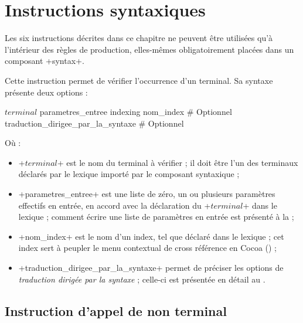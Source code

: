 
\chapter{Instructions syntaxiques}

Les six instructions décrites dans ce chapitre ne peuvent être utilisées qu'à l'intérieur des règles de production, elles-mêmes obligatoirement placées dans un composant \ggs+syntax+.




Cette instruction permet de vérifier l'occurrence d'un terminal. Sa syntaxe présente deux options :
\begin{galgascode}
$terminal$ parametres_entree
indexing nom_index # Optionnel
traduction_dirigee_par_la_syntaxe # Optionnel
\end{galgascode}

Où :
\begin{itemize}
  \item \ggs+$terminal$+ est le nom du terminal à vérifier ; il doit être l'un des terminaux déclarés par le lexique importé par le composant syntaxique ;
  \item \ggs+parametres_entree+ est une liste de zéro, un ou plusieurs paramètres effectifs en entrée, en accord avec la déclaration du \ggs+$terminal$+ dans le lexique ; comment écrire une liste de paramètres en entrée est présenté à la  ;
  \item \ggs+nom_index+ est le nom d'un index, tel que déclaré dans le lexique ; cet index sert à peupler le menu contextual de cross référence en Cocoa () ;
  \item \ggs+traduction_dirigee_par_la_syntaxe+ permet de préciser les options de \emph{traduction dirigée par la syntaxe} ; celle-ci est présentée en détail au . 
\end{itemize}






\section{Instruction d'appel de non terminal}





